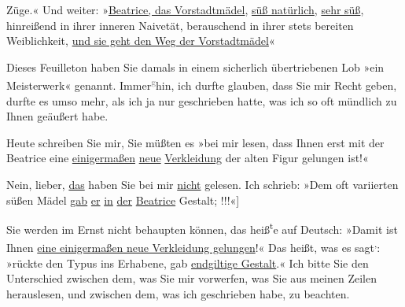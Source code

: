                   Züge.« Und weiter: »\uline{Beatrice, das
                     Vorstadtmädel}, \uline{süß natürlich}, \uline{sehr süß}, hinreißend in ihrer inneren Naivetät,
                  berauschend in ihrer stets bereiten Weiblichkeit, \uline{und
                     sie geht den Weg der Vorstadtmädel}{\dotstwo}«\pend
           
\pstart
           Dieses Feuilleton haben Sie
               damals in einem sicherlich übertriebenen Lob »ein Meisterwerk« genannt. Immer\substVorne{}\textsuperscript{\textcolor{gray}{g}}\substDazwischen{}h\substHinten{}in, ich durfte glauben, dass Sie mir Recht geben, durfte es umso mehr, als
               ich ja nur geschrieben hatte, was ich so oft mündlich zu Ihnen geäußert habe.\pend
           
\pstart
           Heute schreiben Sie mir, Sie müßten es »bei mir lesen, dass Ihnen erst mit der Beatrice eine \uline{einigermaßen}{ }\uline{neue}{ }\uline{Verkleidung} der alten Figur gelungen ist!«\pend
           
\pstart
           Nein, lieber, \uline{das} haben Sie bei mir \uline{nicht} gelesen. Ich schrieb: »Dem oft variierten süßen Mädel \uline{gab}{ }\uline{er}{ }\uline{in}{ }\uline{der}{ }\uline{Beatrice}{ } Gestalt; !!!\pwindex{Arthur Schnitzler und sein »Reigen«@\emph{Arthur Schnitzler und sein »Reigen«}|pwv}{[}«{]}\pend
           
\pstart
           Sie werden im Ernst nicht behaupten können, das heiß\substVorne{}\textsuperscript{t}\substDazwischen{}e\substHinten{} auf Deutsch: »Damit ist Ihnen \uline{eine einigermaßen
                  neue Verkleidung gelungen}!« Das heißt, was es sagt\substVorne{}\textsuperscript{,}\substDazwischen{}:\substHinten{} »rückte den Typus ins
                  Erhabene, gab \uline{endgiltige Gestalt}.« Ich bitte Sie den Unterschied zwischen dem, was Sie mir vorwerfen, was Sie
               aus meinen Zeilen herauslesen, und zwischen dem, was ich geschrieben habe, zu
               beachten.\pend
           
